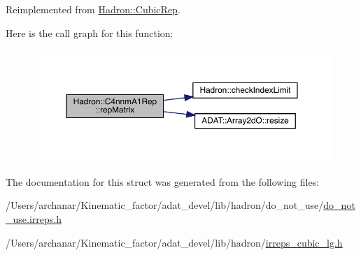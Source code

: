 Reimplemented from \mbox{\hyperlink{structHadron_1_1CubicRep_ac5d7e9e6f4ab1158b5fce3e4ad9e8005}{Hadron\+::\+Cubic\+Rep}}.

Here is the call graph for this function\+:
\nopagebreak
\begin{figure}[H]
\begin{center}
\leavevmode
\includegraphics[width=350pt]{d4/dbc/structHadron_1_1C4nnmA1Rep_afd420b29cea68de99ec5e175a42bafc7_cgraph}
\end{center}
\end{figure}


The documentation for this struct was generated from the following files\+:\begin{DoxyCompactItemize}
\item 
/\+Users/archanar/\+Kinematic\+\_\+factor/adat\+\_\+devel/lib/hadron/do\+\_\+not\+\_\+use/\mbox{\hyperlink{do__not__use_8irreps_8h}{do\+\_\+not\+\_\+use.\+irreps.\+h}}\item 
/\+Users/archanar/\+Kinematic\+\_\+factor/adat\+\_\+devel/lib/hadron/\mbox{\hyperlink{lib_2hadron_2irreps__cubic__lg_8h}{irreps\+\_\+cubic\+\_\+lg.\+h}}\end{DoxyCompactItemize}
